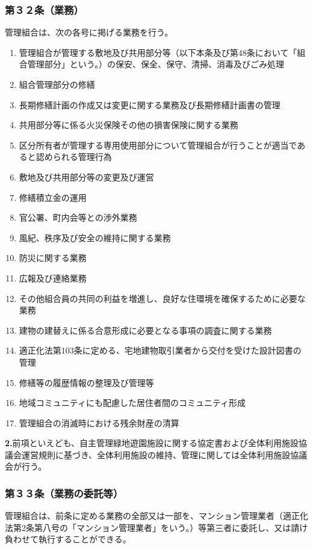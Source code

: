 \documentclass[12pt,uplatex]{jsarticle}
\begin{document}
\subsubsection*{第３２条（業務）}
管理組合は、次の各号に掲げる業務を行う。
\begin{enumerate}
\item 管理組合が管理する敷地及び共用部分等（以下本条及び第48条において「組合管理部分」という。）の保安、保全、保守、清掃、消毒及びごみ処理
\item 組合管理部分の修繕
\item 長期修繕計画の作成又は変更に関する業務及び長期修繕計画書の管理
\item 共用部分等に係る火災保険その他の損害保険に関する業務
\item 区分所有者が管理する専用使用部分について管理組合が行うことが適当であると認められる管理行為
\item 敷地及び共用部分等の変更及び運営
\item 修繕積立金の運用
\item 官公署、町内会等との渉外業務
\item 風紀、秩序及び安全の維持に関する業務
\item 防災に関する業務
\item 広報及び連絡業務
\item その他組合員の共同の利益を増進し、良好な住環境を確保するために必要な業務
\item 建物の建替えに係る合意形成に必要となる事項の調査に関する業務
\item 適正化法第103条に定める、宅地建物取引業者から交付を受けた設計図書の管理
\item 修繕等の履歴情報の整理及び管理等
\item 地域コミュニティにも配慮した居住者間のコミュニティ形成
\item 管理組合の消滅時における残余財産の清算
\end{enumerate}
\textbf{2.}前項といえども、自主管理緑地遊園施設に関する協定書および全体利用施設協議会運営規則に基づき、全体利用施設の維持、管理に関しては全体利用施設協議会が行う。
\subsubsection*{第３３条（業務の委託等）}
管理組合は、前条に定める業務の全部又は一部を、マンション管理業者（適正化法第2条第八号の「マンション管理業者」をいう。）等第三者に委託し、又は請け負わせて執行することができる。
\end{document}
